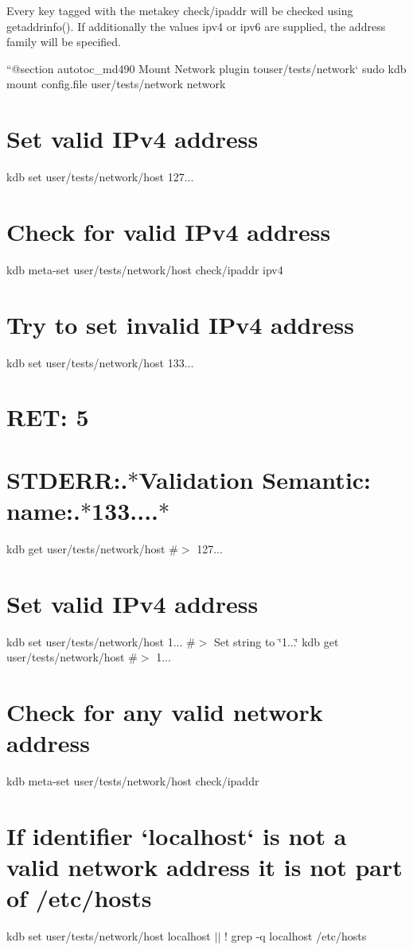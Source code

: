 Every key tagged with the metakey {\ttfamily check/ipaddr} will be checked using {\ttfamily getaddrinfo()}. If additionally the values {\ttfamily ipv4} or {\ttfamily ipv6} are supplied, the address family will be specified.

``{\ttfamily  @section autotoc\+\_\+md490 Mount Network plugin to}user/tests/network` sudo kdb mount config.\+file user/tests/network network\hypertarget{autotoc_md486_autotoc_md491}{}\section{Set valid I\+Pv4 address}\label{autotoc_md486_autotoc_md491}
kdb set user/tests/network/host 127... \hypertarget{autotoc_md486_autotoc_md492}{}\section{Check for valid I\+Pv4 address}\label{autotoc_md486_autotoc_md492}
kdb meta-\/set user/tests/network/host check/ipaddr ipv4\hypertarget{autotoc_md486_autotoc_md493}{}\section{Try to set invalid I\+Pv4 address}\label{autotoc_md486_autotoc_md493}
kdb set user/tests/network/host 133... \hypertarget{autotoc_md486_autotoc_md494}{}\section{R\+E\+T\+: 5}\label{autotoc_md486_autotoc_md494}
\hypertarget{autotoc_md486_autotoc_md495}{}\section{S\+T\+D\+E\+R\+R\+:.$\ast$\+Validation Semantic\+: name\+:.$\ast$133....$\ast$}\label{autotoc_md486_autotoc_md495}
kdb get user/tests/network/host \#$>$ 127...\hypertarget{autotoc_md486_autotoc_md496}{}\section{Set valid I\+Pv4 address}\label{autotoc_md486_autotoc_md496}
kdb set user/tests/network/host 1... \#$>$ Set string to \char`\"{}1...\char`\"{} kdb get user/tests/network/host \#$>$ 1...\hypertarget{autotoc_md486_autotoc_md497}{}\section{Check for any valid network address}\label{autotoc_md486_autotoc_md497}
kdb meta-\/set user/tests/network/host check/ipaddr \textquotesingle{}\textquotesingle{} \hypertarget{autotoc_md486_autotoc_md498}{}\section{If identifier `localhost` is not a valid network address it is not part of /etc/hosts}\label{autotoc_md486_autotoc_md498}
kdb set user/tests/network/host localhost $\vert$$\vert$ ! grep -\/q localhost /etc/hosts

